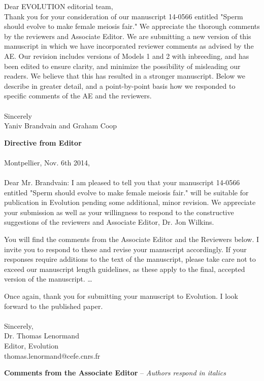 \documentclass[12pt,letterpaper]{article}
\newcommand{\gc}[1]{{ \color{red} #1}}
\begin{document}
Dear EVOLUTION editorial team,
\\

Thank you for your consideration of our manuscript 14-0566 entitled "Sperm should evolve to make female meiosis fair." We appreciate the thorough comments by the reviewers and Associate Editor. We are submitting a new version of this manuscript in which we have incorporated reviewer comments as advised by the AE. Our revision includes versions of Models 1 and 2 with  \gc{inbreeding}, and has been edited to ensure clarity, and minimize the possibility of misleading our readers. We believe that this has resulted in a stronger manuscript. Below we describe in greater detail, and a point-by-point basis how we responded to specific comments of the AE and the reviewers.
\\
\\
Sincerely \\
Yaniv Brandvain and Graham Coop
\newpage


{\bf{Directive from Editor}} \\ \\
Montpellier, Nov. 6th 2014,
\\ \\
Dear Mr. Brandvain: 
I am pleased to tell you that your manuscript 14-0566 entitled "Sperm should evolve to make female meiosis fair." will be suitable for publication in Evolution pending some additional, minor revision. We appreciate your submission as well as your willingness to respond to the constructive suggestions of the reviewers and Associate Editor, Dr. Jon Wilkins.

You will find the comments from the Associate Editor and the Reviewers below. I invite you to respond to these and revise your manuscript accordingly. If your responses require additions to the text of the manuscript, please take care not to exceed our manuscript length guidelines, as these apply to the final, accepted version of the manuscript. \dots{}

Once again, thank you for submitting your manuscript to Evolution.  I look forward to the published paper.
\\  \\
Sincerely, \\
Dr. Thomas Lenormand \\
Editor, Evolution \\
thomas.lenormand@cefe.cnrs.fr

\newpage

{\bf{Comments from the Associate Editor}} -- \emph{Authors respond in italics}  \\ 
\end{document}
